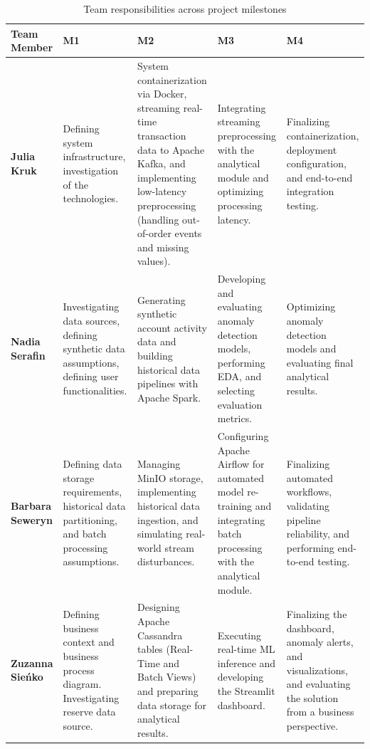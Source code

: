 \documentclass[titlepage]{article}
\begin{document}
\begin{table}[H]
\centering
\caption{Team responsibilities across project milestones}
\label{tab:team_responsibilities}

\footnotesize

\begin{tabularx}{\linewidth}{|>{\RaggedRight\arraybackslash}p{2cm}|*{4}{>{\RaggedRight\arraybackslash}X|}}
\hline

\textbf{\mbox{Team} \mbox{Member}}
    & \textbf{M1} & \textbf{M2} & \textbf{M3} & \textbf{M4} \\
    \hline

    \textbf{Julia Kruk}
    & Defining system infrastructure, investigation of the technologies.
    & System containerization via Docker, streaming real-time transaction data to Apache Kafka, and implementing low-latency preprocessing (handling out-of-order events and missing values).
    & Integrating streaming preprocessing with the analytical module and optimizing processing latency.
    & Finalizing containerization, deployment configuration, and end-to-end integration testing. \\
    \hline

    \textbf{\mbox{Nadia} \mbox{Serafin}}
    & Investigating data sources, defining synthetic data assumptions, defining user functionalities.
    & Generating synthetic account activity data and building historical data pipelines with Apache Spark.
    & Developing and evaluating anomaly detection models, performing EDA, and selecting evaluation metrics.
    & Optimizing anomaly detection models and evaluating final analytical results. \\
    \hline

    \textbf{Barbara Seweryn}
    & Defining data storage requirements, historical data partitioning, and batch processing assumptions.
    & Managing MinIO storage, implementing historical data ingestion, and simulating real-world stream disturbances.
    & Configuring Apache Airflow for automated model re-training and integrating batch processing with the analytical module.
    & Finalizing automated workflows, validating pipeline reliability, and performing end-to-end testing. \\
    \hline

    \textbf{Zuzanna Sieńko}
    & Defining business context and business process diagram. Investigating reserve data source.
    & Designing Apache Cassandra tables (Real-Time and Batch Views) and preparing data storage for analytical results.
    & Executing real-time ML inference and developing the Streamlit dashboard.
    & Finalizing the dashboard, anomaly alerts, and visualizations, and evaluating the solution from a business perspective. \\
    \hline

\end{tabularx}
\end{table}
\end{document}
